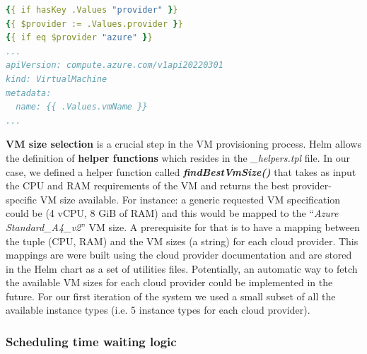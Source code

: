 \vspace{0.5cm}


\vspace{0.5cm}

\begin{lstlisting}[language=yaml, caption={Helm Template guards example}, label={lst:guards}]
{{ if hasKey .Values "provider" }}
{{ $provider := .Values.provider }}
{{ if eq $provider "azure" }}
...
apiVersion: compute.azure.com/v1api20220301
kind: VirtualMachine
metadata:
  name: {{ .Values.vmName }}
...
\end{lstlisting}


\textbf{VM size selection} is a crucial step in the VM provisioning process.
Helm allows the definition of \textbf{helper functions} which resides in the \textit{\_helpers.tpl} file.
In our case, we defined a helper function called \textbf{\textit{findBestVmSize()}} that takes as input the CPU and RAM requirements of the VM and returns the best provider-specific VM size available.
For instance: a generic requested VM specification could be (4 vCPU, 8 GiB of RAM) and this would be mapped to the ``\textit{Azure Standard\_A4\_v2}'' VM size.
A prerequisite for that is to have a mapping between the tuple (CPU, RAM) and the VM sizes (a string) for each cloud provider.
This mappings are were built using the cloud provider documentation and are stored in the Helm chart as a set of utilities files.
Potentially, an automatic way to fetch the available VM sizes for each cloud provider could be implemented in the future.
For our first iteration of the system we used a small subset of all the available instance types (i.e. 5 instance types for each cloud provider).

\subsubsection{Scheduling time waiting logic}

